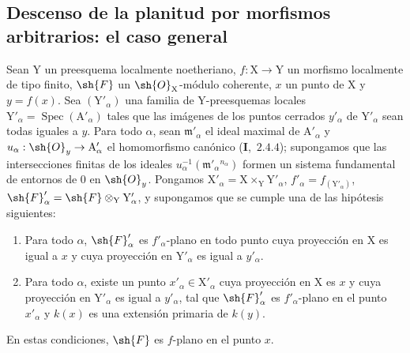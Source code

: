 \subsection{Descenso de la planitud por morfismos arbitrarios: el caso general}
\label{subsection:IV.11.5}

\begin{theorem}[11.5.1]
\label{IV.11.5.1}
Sean $\mathrm{Y}$ un preesquema localmente noetheriano, $f:\mathrm{X}\to\mathrm{Y}$ un
morfismo localmente de tipo finito, $\sh{F}$ un $\sh{O}_\mathrm{X}$-módulo coherente, $x$ un punto de $\mathrm{X}$ y $y=f(x)$. Sea $(\mathrm{Y}'_\alpha)$
una familia de $\mathrm{Y}$-preesquemas locales $\mathrm{Y}'_\alpha=\operatorname{Spec}(\mathrm{A}'_\alpha)$ tales que las imágenes de los puntos cerrados $y'_\alpha$
de $\mathrm{Y}'_\alpha$ sean todas iguales a $y$. Para todo $\alpha$, sean $\mathfrak{m}'_\alpha$ el ideal maximal de $\mathrm{A}'_\alpha$ y $u_\alpha:\sh{O}_y\to\mathrm{A}'_\alpha$
el homomorfismo canónico (\textbf{I},~$2.4.4$); supongamos que las intersecciones finitas de los ideales
$u_\alpha^{-1}(\mathfrak{m}'_\alpha{}^{n_\alpha})$
formen un sistema fundamental de entornos de $0$ en $\sh{O}_y$. Pongamos $\mathrm{X}'_\alpha=\mathrm{X}\times_\mathrm{Y}\mathrm{Y}'_\alpha$, $f'_\alpha=f_{(\mathrm{Y}'_\alpha)}$,
$\sh{F}'_\alpha=\sh{F}\otimes_\mathrm{Y}\mathrm{Y}'_\alpha$, y supongamos que se cumple una de las hipótesis siguientes:
\begin{enumerate}[label=(\roman*)]
  \item Para todo $\alpha$, $\sh{F}'_\alpha$ es $f'_\alpha$-plano en todo punto cuya proyección en $\mathrm{X}$ es igual
  a $x$ y cuya proyección en $\mathrm{Y}'_\alpha$ es igual a $y'_\alpha$.
  \item Para todo $\alpha$, existe un punto $x'_\alpha\in\mathrm{X}'_\alpha$ cuya proyección en $\mathrm{X}$ es $x$ y cuya proyección en $\mathrm{Y}'_\alpha$
  es igual a $y'_\alpha$, tal que $\sh{F}'_\alpha$ es $f'_\alpha$-plano en el punto $x'_\alpha$ y $k(x)$ es una extensión primaria de $k(y)$.
\end{enumerate}

En estas condiciones, $\sh{F}$ es $f$-plano en el punto $x$.
\end{theorem}

